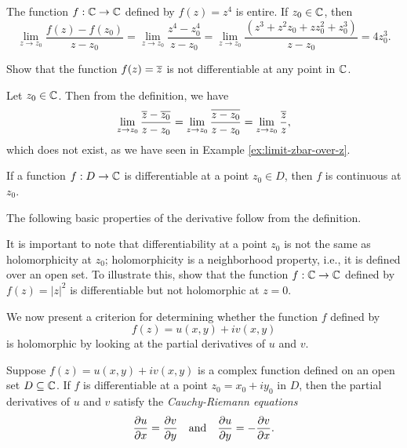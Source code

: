 \begin{example}
    The function \(f : \mathbb{C} \to \mathbb{C}\) defined by \(f(z) = z^4\) is entire. If \(z_0 \in \mathbb{C}\), then
    \[
        \lim_{z \to z_0} \frac{f(z) - f(z_0)}{z - z_0} = \lim_{z \to z_0} \frac{z^4 - z_0^4}{z - z_0} = \lim_{z \to z_0} \frac{(z^3 + z^2z_0 + zz_0^2 + z_0^3)}{z - z_0} = 4z_0^3.
    \]
\end{example}

\begin{example}
    Show that the function \(f(z) = \overline{z}\) is not differentiable at any point in \(\mathbb{C}\).

    \begin{solution}
        Let \(z_0 \in \mathbb{C}\). Then from the definition, we have
        \[
            \lim_{z \to z_0} \frac{\overline{z} - \overline{z_0}}{z - z_0} = \lim_{z \to z_0} \frac{\overline{z - z_0}}{z - z_0} = \lim_{z \to z_0} \frac{\overline{z}}{z},
        \]
        which does not exist, as we have seen in Example \ref{ex:limit-zbar-over-z}.
    \end{solution}
\end{example}

\begin{theorem}
    If a function \(f : D \to \mathbb{C}\) is differentiable at a point \(z_0 \in D\), then \(f\) is continuous at \(z_0\).
    \label{thm:differentiability-implies-continuity}
\end{theorem}

The following basic properties of the derivative follow from the definition.



\begin{example}
    It is important to note that differentiability at a point \(z_0\) is not the same as holomorphicity at \(z_0\); holomorphicity is a neighborhood property, i.e., it is defined over an open set. To illustrate this, show that the function \(f: \mathbb{C} \to \mathbb{C}\) defined by \(f(z) = |z|^2\) is differentiable but not holomorphic at \(z = 0\).
\end{example}

We now present a criterion for determining whether the function \(f\) defined by
\[
    f(z) = u(x, y) + iv(x, y)
\]
is holomorphic by looking at the partial derivatives of \(u\) and \(v\).

\begin{theorem}
    \label{thm:cauchy-riemann}
    Suppose \(f(z) = u(x, y) + iv(x, y)\) is a complex function defined on an open set \(D \subseteq \mathbb{C}\). If \(f\) is differentiable at a point \(z_0 = x_0 + iy_0\) in \(D\), then the partial derivatives of \(u\) and \(v\) satisfy the \emph{Cauchy-Riemann equations}
    \begin{equation}
        \frac{\partial u}{\partial x} = \frac{\partial v}{\partial y} \quad \text{and} \quad \frac{\partial u}{\partial y} = -\frac{\partial v}{\partial x}.
        \label{eq:cauchy-riemann}
    \end{equation}
\end{theorem}


